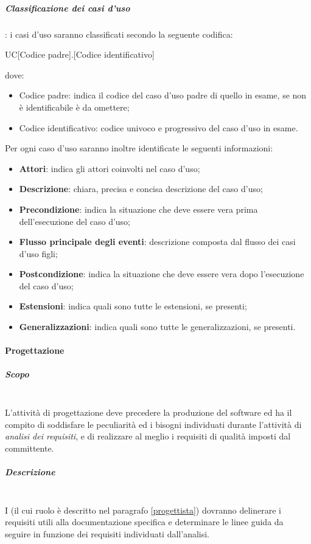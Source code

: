 \subparagraph{Classificazione dei casi d'uso}: i casi d’uso saranno classificati secondo la seguente codifica:
		\begin{center}
			UC[Codice padre].[Codice identificativo]
		\end{center}
	dove:
		\begin{itemize}
			\item Codice padre: indica il codice del caso d’uso padre di quello in esame, se non è identificabile è da omettere;
			\item Codice identificativo: codice univoco e progressivo del caso d’uso in esame.
		\end{itemize}
	Per ogni caso d’uso saranno inoltre identificate le seguenti informazioni:
		\begin{itemize}
			\item \textbf{Attori}: indica gli attori coinvolti nel caso d’uso;
			\item \textbf{Descrizione}: chiara, precisa e concisa descrizione del caso d’uso;
			\item \textbf{Precondizione}: indica la situazione che deve essere vera prima dell’esecuzione del caso d’uso;
			\item \textbf{Flusso principale degli eventi}: descrizione composta dal flusso dei casi d’uso figli;
			\item \textbf{Postcondizione}: indica la situazione che deve essere vera dopo l’esecuzione del caso d’uso;
			\item \textbf{Estensioni}: indica quali sono tutte le estensioni, se presenti;
			\item \textbf{Generalizzazioni}: indica quali sono tutte le generalizzazioni, se presenti.
		\end{itemize}
	
\paragraph{Progettazione}
\subparagraph{Scopo}
	~\\L'attività di progettazione deve precedere la produzione del software ed ha il compito di soddisfare le peculiarità ed i bisogni individuati durante l'attività di \emph{analisi dei requisiti}, e di realizzare al meglio i requisiti di qualità imposti dal committente.
\subparagraph{Descrizione}
	~\\I \progs{} (il cui ruolo è descritto nel paragrafo \ref{progettista}) dovranno delinerare i requisiti utili alla documentazione specifica e determinare le linee guida da seguire in funzione dei requisiti individuati dall'analisi.
	
